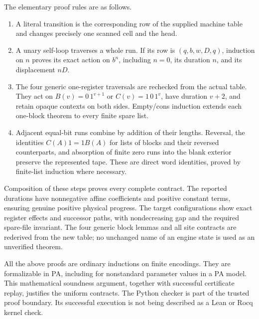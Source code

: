 \documentclass[11pt]{article}
\newcommand{\file}[1]{\texttt{\nolinkurl{#1}}}
\begin{document}
The elementary proof rules are as follows.
\begin{enumerate}
\item A literal transition is the corresponding row of the supplied
machine table and changes precisely one scanned cell and the head.
\item A unary self-loop traverses a whole run.  If its row is
$(q,b,w,D,q)$, induction on $n$ proves its exact action on $b^n$,
including $n=0$, its duration $n$, and its displacement $nD$.
\item The four generic one-register traversals are rechecked from
the actual table.  They act on
$B(v)=0\,1^{v+1}$ or $C(v)=1\,0\,1^v$, have duration $v+2$,
and retain opaque contexts on both sides.  Empty/cons induction
extends each one-block theorem to every finite spare list.
\item Adjacent equal-bit runs combine by addition of their lengths.
Reversal, the identities $C(A)1=1B(A)$ for lists of blocks and their
reversed counterparts, and absorption of finite zero runs into the
blank exterior preserve the represented tape.  These are direct
word identities, proved by finite-list induction where necessary.
\end{enumerate}
Composition of these steps proves every complete contract.  The
reported durations have nonnegative affine coefficients and positive
constant terms, ensuring genuine positive physical progress.
The target configurations show exact register effects and successor
paths, with nondecreasing gap and the required spare-file invariant.
The four generic block lemmas and all site contracts are rederived
from the new table; no unchanged name of an engine state is used
as an unverified theorem.

All the above proofs are ordinary inductions on finite encodings.
They are formalizable in PA, including for nonstandard parameter
values in a PA model.  This mathematical soundness argument, together
with successful certificate replay, justifies the uniform contracts.
The Python checker is part of the trusted proof boundary.  Its
successful execution is not being described as a Lean or Rocq
kernel check.

\end{document}
